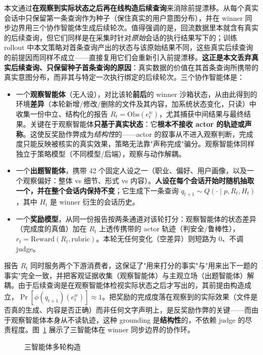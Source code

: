 本文通过\textbf{在观察到实际状态之后再在线构造后续查询}来消除前提漂移。从每个真实会话中只保留第一条查询作为种子（保住真实的用户意图分布），并在 winner 同步边界用三个协作智能体生成后续轮次。值得强调的是，回流数据里本就含有真实的后续查询，但它们同样是在采集时针对\textit{原始}会话的执行结果写下的；训练 rollout 中本文策略对首条查询产出的状态与该原始结果不同，这些真实后续查询的前提因而同样不成立——直接复用它们会重新引入前提漂移。\textbf{这正是本文丢弃真实后续查询、只保留种子首条查询的原因}：真实数据的价值在其首条查询所携带的真实意图分布，而非其与特定一次执行绑定的后续轮次。三个协作智能体是：

\begin{itemize}
  \item 一个\textbf{观察智能体}（无人设），对比该轮\textbf{前后}的 winner 沙箱状态，从由此得到的环境\textbf{差异}（本轮新增/修改/删除的文件及其内容，加系统状态变化，只读）中收集一份中立、结构化的报告 $R_t = \mathrm{Obs}(e_t^w)$，尤其捕获中间结果与最终结果。关键在于观察智能体\textbf{只基于真实状态}：它\textbf{根本不接收 actor 的轨迹或声称}。这使反奖励作弊成为\textit{结构性}的——actor 的叙事从不进入观察判断，完成度只能反映被核实的真实效果，策略无法靠"声称完成"骗分。观察智能体同样独立于策略模型（不同模型/后端），观察与动作解耦。
  \item 一个\textbf{出题智能体}，携带 42 个固定人设之一（职业、偏好、用户画像，以及一个观察偏好：整体 vs 细节、形式 vs 内容）。\textbf{人设在每个会话开始时随机抽取一个，并在整个会话内保持不变}；它生成下一条查询 $q_{t+1}\sim Q(\cdot\mid p, R_t, H_t)$，其中 $H_t$ 是 winner 衍生的会话历史。
  \item 一个\textbf{奖励模型}，从同一份报告按两条通道对该轮打分：观察智能体的状态差异（完成度的真值）加在 $R_t$ 上透传携带的 actor 轨迹（判安全/鲁棒性），$r_t = \mathrm{Reward}(R_t, \text{rubric})$。本轮无任何变化（空差异）则短路为 0、不调 judge。
\end{itemize}

报告 $R_t$ 同时服务两个下游消费者，这保证了"用来打分的事实"与"用来出下一题的事实"完全一致，并把客观证据收集（观察智能体）与主观立场（出题智能体）解耦。由于后续查询是在观察智能体检视实际状态之后才写出的，其前提由构造成立，$\Pr[\phi(q_{t+1})(e_t^w)]\approx 1$。把奖励的完成度落在观察到的实际效果（文件是否真的生成、内容是否正确）而非任何文字声明上，是反奖励作弊的关键——而由于观察智能体本身从不读轨迹，这种 grounding 是\textbf{结构性}的，不依赖 judge 的尽责程度。图~\ref{fig:threeagent} 展示了三智能体在 winner 同步边界的协作环。

\begin{figure}[htbp]
\centering
{}
\caption{三智能体多轮构造}
\label{fig:threeagent}
\end{figure}

